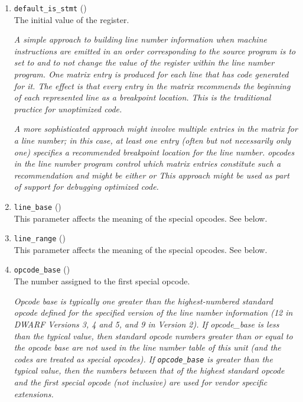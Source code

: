 \begin{enumerate}[1. ]
\item \texttt{default\_is\_stmt} () \\
The initial value of the  register.  

\textit{A simple approach
to building line number information when machine instructions
are emitted in an order corresponding to the source program
is to set 
to  and to not change the
value of the  register 
within the line number program.
One matrix entry is produced for each line that has code
generated for it. The effect is that every entry in the
matrix recommends the beginning of each represented line as
a breakpoint location. This is the traditional practice for
unoptimized code.}

\textit{A more sophisticated approach might involve multiple entries in
the matrix for a line number; in this case, at least one entry
(often but not necessarily only one) specifies a recommended
breakpoint location for the line number. \DWLNSnegatestmt{}
opcodes in the line number program control which matrix entries
constitute such a recommendation and 
 might
be either  or  This approach might be
used as part of support for debugging optimized code.}

\item \texttt{line\_base} () \\
This parameter affects the meaning of the special opcodes. See below.

\item \texttt{line\_range} () \\
This parameter affects the meaning of the special opcodes. See below.

\item \texttt{opcode\_base} () \\
The 
number assigned to the first special opcode.

\textit{Opcode base is typically one greater than the highest-numbered
standard opcode defined for the specified version of the line
number information (12 in DWARF Versions 3, 4 and 5,
and 9 in
Version 2).  
If opcode\_base is less than the typical value,
then standard opcode numbers greater than or equal to the
opcode base are not used in the line number table of this unit
(and the codes are treated as special opcodes). If \texttt{opcode\_base}
is greater than the typical value, then the numbers between
that of the highest standard opcode and the first special
opcode (not inclusive) are used for vendor specific extensions.}


\end{enumerate}

